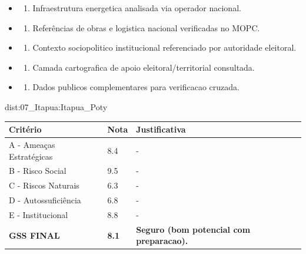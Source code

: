 {\begin{itemize}
\item
  \begin{enumerate}
  \def\labelenumi{\arabic{enumi})}
  \setcounter{enumi}{7}
  \tightlist
  \item
    Infraestrutura energetica analisada via operador nacional.
  \end{enumerate}
\item
  \begin{enumerate}
  \def\labelenumi{\arabic{enumi})}
  \setcounter{enumi}{8}
  \tightlist
  \item
    Referências de obras e logistica nacional verificadas no MOPC.
  \end{enumerate}
\item
  \begin{enumerate}
  \def\labelenumi{\arabic{enumi})}
  \setcounter{enumi}{9}
  \tightlist
  \item
    Contexto sociopolitico institucional referenciado por autoridade
    eleitoral.
  \end{enumerate}
\item
  \begin{enumerate}
  \def\labelenumi{\arabic{enumi})}
  \setcounter{enumi}{10}
  \tightlist
  \item
    Camada cartografica de apoio eleitoral/\allowbreak territorial consultada.
  \end{enumerate}
\item
  \begin{enumerate}
  \def\labelenumi{\arabic{enumi})}
  \setcounter{enumi}{11}
  \tightlist
  \item
    Dados publicos complementares para verificacao cruzada.
  \end{enumerate}
\end{itemize}}{dist:07_Itapua:Itapua_Poty}
\begin{table}[ht!]
\small \begin{tabular}{p{3.0cm}p{0.8cm}p{6.0cm}} \toprule
\textbf{Critério} & \textbf{Nota} & \textbf{Justificativa} \\ \midrule
A - Ameaças Estratégicas & 8.4 & - \\
B - Risco Social & 9.5 & - \\
C - Riscos Naturais & 6.3 & - \\
D - Autossuficiência & 6.8 & - \\
E - Institucional & 8.8 & - \\
\midrule \textbf{GSS FINAL} & \textbf{8.1} & \textbf{Seguro (bom potencial com preparacao).} \\ \bottomrule \end{tabular}
\end{table}
